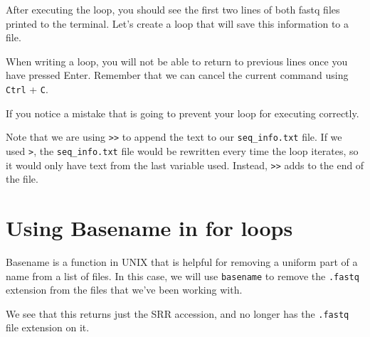 \documentclass[
  letterpaper,
  DIV=11,
  numbers=noendperiod]{scrreprt}
\newenvironment{Shaded}{\begin{snugshade}}{\end{snugshade}}
\newcommand{\ExtensionTok}[1]{\textcolor[rgb]{0.00,0.23,0.31}{#1}}
\newcommand{\NormalTok}[1]{\textcolor[rgb]{0.00,0.23,0.31}{#1}}
\newcommand{\OperatorTok}[1]{\textcolor[rgb]{0.37,0.37,0.37}{#1}}
\newcommand{\PreprocessorTok}[1]{\textcolor[rgb]{0.68,0.00,0.00}{#1}}
\newcommand{\VariableTok}[1]{\textcolor[rgb]{0.07,0.07,0.07}{#1}}
\begin{document}
After executing the loop, you should see the first two lines of both
fastq files printed to the terminal. Let's create a loop that will save
this information to a file.

\begin{Shaded}
\end{Shaded}

When writing a loop, you will not be able to return to previous lines
once you have pressed Enter. Remember that we can cancel the current
command using \texttt{Ctrl} + \texttt{C}.

If you notice a mistake that is going to prevent your loop for executing
correctly.

Note that we are using \texttt{\textgreater{}\textgreater{}} to append
the text to our \texttt{seq\_info.txt} file. If we used
\texttt{\textgreater{}}, the \texttt{seq\_info.txt} file would be
rewritten every time the loop iterates, so it would only have text from
the last variable used. Instead, \texttt{\textgreater{}\textgreater{}}
adds to the end of the file.

\section{Using Basename in for loops}\label{using-basename-in-for-loops}

Basename is a function in UNIX that is helpful for removing a uniform
part of a name from a list of files. In this case, we will use
\texttt{basename} to remove the \texttt{.fastq} extension from the files
that we've been working with.

\begin{Shaded}
\end{Shaded}

We see that this returns just the SRR accession, and no longer has the
\texttt{.fastq} file extension on it.
\end{document}
